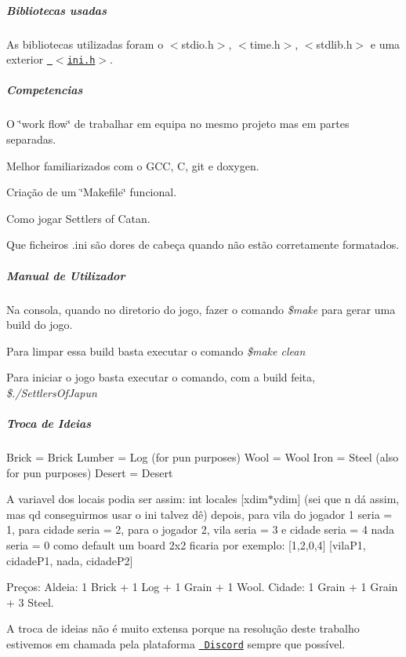 \subparagraph*{Bibliotecas usadas}


\begin{DoxyItemize}
\item As bibliotecas utilizadas foram o $<$stdio.\+h$>$, $<$time.\+h$>$, $<$stdlib.\+h$>$ e uma exterior \href{https://github.com/rxi/ini}{\texttt{ $<$ini.\+h$>$}}. \subparagraph*{Competencias}
\end{DoxyItemize}


\begin{DoxyItemize}
\item O \char`\"{}work flow\char`\"{} de trabalhar em equipa no mesmo projeto mas em partes separadas.
\item Melhor familiarizados com o G\+CC, C, git e doxygen.
\item Criação de um \char`\"{}\+Makefile\char`\"{} funcional.
\item Como jogar Settlers of Catan.
\item Que ficheiros .ini são dores de cabeça quando não estão corretamente formatados. \subparagraph*{Manual de Utilizador}
\end{DoxyItemize}


\begin{DoxyItemize}
\item Na consola, quando no diretorio do jogo, fazer o comando {\itshape \$make} para gerar uma build do jogo.
\item Para limpar essa build basta executar o comando {\itshape \$make clean}
\item Para iniciar o jogo basta executar o comando, com a build feita, {\itshape \$./\+Settlers\+Of\+Japun} \subparagraph*{Troca de Ideias}
\end{DoxyItemize}


\begin{DoxyItemize}
\item Brick = Brick Lumber = Log (for pun purposes) Wool = Wool Iron = Steel (also for pun purposes) Desert = Desert
\item A variavel dos locais podia ser assim\+: int locales \mbox{[}xdim$\ast$ydim\mbox{]} (sei que n dá assim, mas qd conseguirmos usar o ini talvez dê) depois, para vila do jogador 1 seria = 1, para cidade seria = 2, para o jogador 2, vila seria = 3 e cidade seria = 4 nada seria = 0 como default um board 2x2 ficaria por exemplo\+: \mbox{[}1,2,0,4\mbox{]} \mbox{[}vila\+P1, cidade\+P1, nada, cidade\+P2\mbox{]}
\item Preços\+: Aldeia\+: 1 Brick + 1 Log + 1 Grain + 1 Wool. Cidade\+: 1 Grain + 1 Grain + 3 Steel.
\item A troca de ideias não é muito extensa porque na resolução deste trabalho estivemos em chamada pela plataforma \href{https://discordapp.com}{\texttt{ Discord}} sempre que possível. 
\end{DoxyItemize}